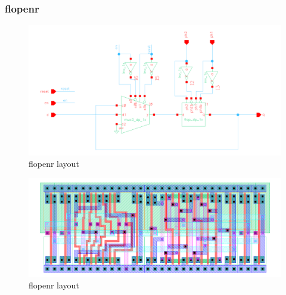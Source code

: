 \documentclass[]{article}
\begin{document}
\subsubsection{flopenr}
\begin{figure}[H]
\centering
\includegraphics[width=.9\textwidth]{flopenr-schematic}
\caption{flopenr layout}
\label{fig:flopenr-schematic}
\end{figure}

\begin{figure}[H]
\centering
\includegraphics[width=.9\textwidth]{flopenr-layout}
\caption{flopenr layout}
\label{fig:flopenr-layout}
\end{figure}
\end{document}
